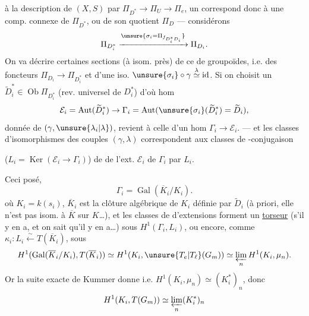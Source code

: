  à la description de $(X,S)$ par
$\Pi_{D^*}\to\Pi_U\to\Pi_e$, un  correspond donc à une comp. connexe  de $\Pi_{D^*}$, ou  de son quotient $\Pi_D$ --- considérons
\[
\Pi_{D_i^*}\xrightarrow{\unsure{\sigma_i=\Pi_{f_{D_i^*D_i}}}}\Pi_{D_i}.
\]
On va décrire certaines sections (à isom. près) de ce   de groupoïdes, i.e. des  foncteurs
$\Pi_{D_i}\to\Pi_{D_i^*}$ et d'une iso. $\unsure{\sigma_i}\circ\gamma\overset{\lambda}{\simeq}\operatorname{id}$.
Si on choisit un $\widetilde{D}_i^*\in\operatorname{Ob}\Pi_{D_i^*}$ (rev. universel de $D_i^*$) d'où hom 
\[
\mathcal{E}_i=\operatorname{Aut}(\widetilde{D}_i^*)\to\Gamma_i
=\operatorname{Aut}(\unsure{\sigma_i}(\widetilde{D}_i^*)=\widetilde{D}_i),
\]
  donnée de $(\gamma,\unsure{\lambda_i|\lambda})$,  revient à celle d'un hom $\Gamma_i\to\mathcal{E}_i$.
--- et les classes d'isomorphismes des couples $(\gamma,\lambda)$ correspondent aux classes de -conjugaison


($L_i=\operatorname{Ker}(\mathcal{E}_i\to\Gamma_i)$) de   de l'ext. $\mathcal{E}_i$ de $\Gamma_i$ par $L_i$.

Ceci posé, 
\[
\Gamma_i=\operatorname{Gal}(\overline{K}_i/K_i).
\]
où $K_i=k(s_i)$, $\overline{K}_i$ est la clôture algébrique de $K_i$ définie par $\widetilde{D}_i$ (à priori, elle n'est pas  isom. à $\overline{K}$ sur $K$\ldots), et les classes de   d'extensions forment un \uline{torseur}  (s'il y en a, et on sait qu'il y en a\ldots) sous $H^1(\Gamma_i,L_i)$, ou encore, comme $\kappa_i:L_i\xleftarrow{\sim}T(\overline{K}_i)$, sous
\[
H^1(\operatorname{Gal}(\overline{K}_i/K_i),T(\overline{K}_i))
\simeq H^1(K_i,\unsure{T_e|T_\ell}(G_m))
\simeq\varprojlim_n H^1(K_i,\mu_n).
\]
Or la suite exacte de Kummer donne
i.e. $H^1(K_i,\mu_n)\simeq(K_i^*)_n$, donc
\[
H^1(K_i,T(G_m))\simeq\varprojlim_n(K_i^*)_n
\]


